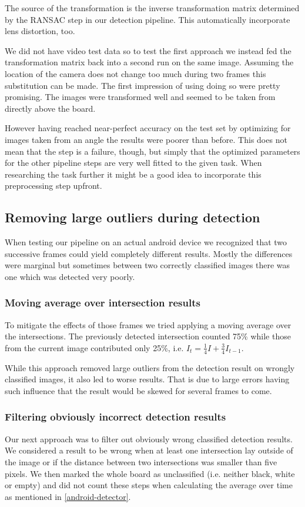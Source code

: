 	The source of the transformation is the inverse transformation matrix determined by the RANSAC step in our detection pipeline. This automatically incorporate lens distortion, too.

	We did not have video test data so to test the first approach we instead fed the transformation matrix back into a second run on the same image. Assuming the location of the camera does not change too much during two frames this substitution can be made. The first impression of using doing so were pretty promising. The images were transformed well and seemed to be taken from directly above the board.

	However having reached near-perfect accuracy on the test set by optimizing for images taken from an angle the results were poorer than before. This does not mean that the step is a failure, though, but simply that the optimized parameters for the other pipeline steps are very well fitted to the given task. When researching the task further it might be a good idea to incorporate this preprocessing step upfront.

	\subsection{Removing large outliers during detection}
	When testing our pipeline on an actual android device we recognized that two successive frames could yield completely different results. Mostly the differences were marginal but sometimes between two correctly classified images there was one which was detected very poorly.

	\subsubsection{Moving average over intersection results}
	To mitigate the effects of those frames we tried applying a moving average over the intersections. The previously detected intersection counted 75\% while those from the current image contributed only 25\%, i.e. $I_t = \frac{1}{4}I + \frac{3}{4}I_{t-1}$.

	While this approach removed large outliers from the detection result on wrongly classified images, it also led to worse results. That is due to large errors having such influence that the result would be skewed for several frames to come.

	\subsubsection{Filtering obviously incorrect detection results}
	Our next approach was to filter out obviously wrong classified detection results. We considered a result to be wrong when at least one intersection lay outside of the image or if the distance between two intersections was smaller than five pixels. We then marked the whole board as unclassified (i.e. neither black, white or empty) and did not count these steps when calculating the average over time as mentioned in \autoref{android-detector}.

